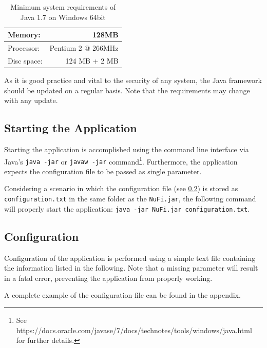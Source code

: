 \documentclass[a4paper, 12pt]{article}
\newcommand{\code}[1]{\colorbox{codegray}{\texttt{#1}}}
\begin{document}
\begin{table}[h]
\centering
\begin{tabular}{ l | r }
Memory: & 128MB \\
\hline
Processor: & Pentium 2 @ 266MHz \\
\hline
Disc space: & 124 MB + 2 MB \\
\end{tabular}
\caption{Minimum system requirements of Java 1.7 on Windows 64bit}
\label{tab:system_requirements_java7}
\end{table}

As it is good practice and vital to the security of any system, the Java
framework should be updated on a regular basis. Note that the requirements may
change with any update.

\subsection{Starting the Application}
Starting the application is accomplished using the command line interface via
Java's \code{java -jar} or \code{javaw -jar} command\footnote{See
https://docs.oracle.com/javase/7/docs/technotes/tools/windows/java.html for
further details.}. Furthermore, the application expects the configuration file
to be passed as single parameter.

Considering a scenario in which the configuration file (see \ref{sec:configuration}) is
stored as \code{configuration.txt} in the same folder as the \code{NuFi.jar}, the
following command will properly start the application:
\newline\code{java -jar NuFi.jar configuration.txt}.


\subsection{Configuration}\label{sec:configuration}
Configuration of the application is performed using a simple text file
containing the information listed in the following. Note that a missing
parameter will result in a fatal error, preventing the application from properly
working.

A complete example of the configuration file can be found in the appendix.
\end{document}
